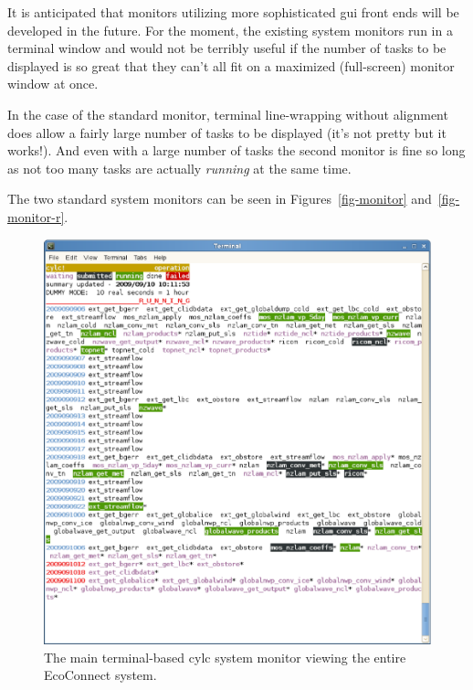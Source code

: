 \documentclass[11pt,a4paper]{article}
\begin{document}
It is anticipated that monitors utilizing more sophisticated gui front
ends will be developed in the future. For the moment, the existing
system monitors run in a terminal window and would not be terribly
useful if the number of tasks to be displayed is so great that they
can't all fit on a maximized (full-screen) monitor window at once.

In the case of the standard monitor, terminal line-wrapping without
alignment does allow a fairly large number of tasks to be displayed
(it's not pretty but it works!). And even with a large number of tasks
the second monitor is fine so long as not too many tasks are actually
{\em running} at the same time. 

The two standard system monitors can be seen in
Figures~\ref{fig-monitor} and~\ref{fig-monitor-r}.

\begin{figure} \label{fig-monitor-eco} 
    \begin{center}
        \includegraphics[width=14cm]{eco-monitor} 
    \end{center}
    \caption[monitor view of EcoConnect]{\small The main terminal-based
    cylc system monitor viewing the entire EcoConnect system.}
\end{figure} 
\end{document}
